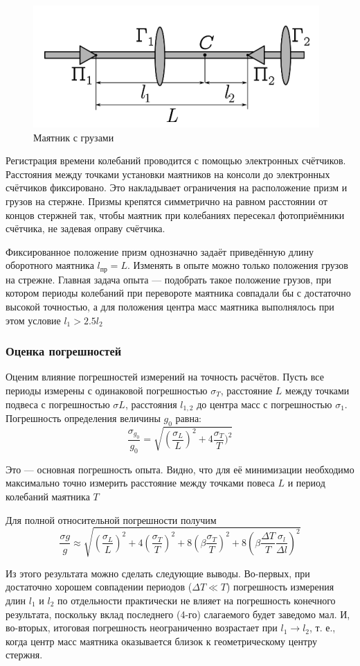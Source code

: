 \documentclass[a4paper, 12pt]{article}
\begin{document}
\begin{center}
\begin{figure}[H]
    \centering
    \includegraphics[width=0.5\linewidth]{image_2.png}
    \caption{Маятник с грузами}
\end{figure}

Регистрация времени колебаний проводится с помощью электронных 
счётчиков. Расстояния между точками установки маятников на консоли до электронных счётчиков фиксировано. Это накладывает ограничения на расположение призм и грузов на стержне. Призмы крепятся симметрично на равном расстоянии от концов стержней так, чтобы маятник при колебаниях пересекал фотоприёмники счётчика, не задевая оправу счётчика.

Фиксированное положение призм однозначно задаёт приведённую 
длину оборотного маятника $l_{\text{пр}} = L$. Изменять в опыте можно только положения грузов на стрежне. Главная задача опыта — подобрать такое положение грузов, при котором периоды колебаний при перевороте маятника совпадали бы с достаточно высокой точностью, а для положения центра масс маятника выполнялось при этом условие $l_{1} > 2.5 l_{2}$\\

\subsubsection*{Оценка погрешностей}

\bigskip

Оценим влияние погрешностей измерений на точность расчётов. Пусть все периоды измерены с одинаковой погрешностью $\sigma_{T}$, расстояние $L$ между точками подвеса с погрешностью $\sigma{L}$, расстояния $l_{1,2}$ до центра масс с погрешностью $\sigma_{1}$. Погрешность определения величины $g_{0}$ равна:
$$\frac{\sigma_{g_{0}}}{g_{0}} = \sqrt{(\frac{\sigma_{L}}{L})^2 + 4\frac{\sigma_{T}}{T})^2}$$

Это — основная погрешность опыта. Видно, что для её минимизации необходимо максимально точно измерить расстояние между точками повеса $L$ и период колебаний маятника $T$

Для полной относительной погрешности получим
$$\frac{\sigma{g}}{g} \approx \sqrt{(\frac{\sigma_{L}}{L})^2 + 4(\frac{\sigma_{T}}{T})^2 + 8(\beta\frac{\sigma_{T}}{T})^2 + 8(\beta\frac{\varDelta T}{T}\frac{\sigma_{l}}{\varDelta l})^2}$$

Из этого результата можно сделать следующие выводы. Во-первых, при 
достаточно хорошем совпадении периодов ($\varDelta T \ll T$) погрешность измерения длин $l_{1}$ и $l_{2}$ по отдельности практически не влияет на погрешность конечного результата, поскольку вклад последнего (4-го) слагаемого будет заведомо мал. И, во-вторых, итоговая погрешность неограниченно возрастает при $l_{1} → l_{2}$, т. е., когда центр масс маятника оказывается близок к геометрическому центру стержня.

\end{center}
\end{document}
